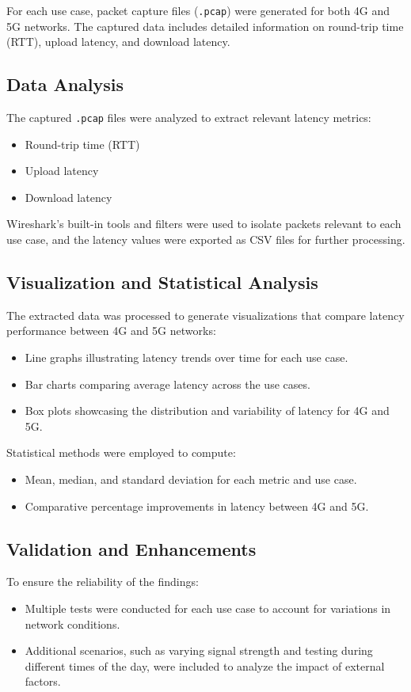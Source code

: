 \documentclass[conference]{IEEEtran}
\begin{document}
For each use case, packet capture files (\texttt{.pcap}) were generated for both 4G and 5G networks. The captured data includes detailed information on round-trip time (RTT), upload latency, and download latency. 

\subsection*{Data Analysis}
The captured \texttt{.pcap} files were analyzed to extract relevant latency metrics:
\begin{itemize}
    \item Round-trip time (RTT)
    \item Upload latency
    \item Download latency
\end{itemize}
Wireshark's built-in tools and filters were used to isolate packets relevant to each use case, and the latency values were exported as CSV files for further processing.

\subsection*{Visualization and Statistical Analysis}
The extracted data was processed to generate visualizations that compare latency performance between 4G and 5G networks:
\begin{itemize}
    \item Line graphs illustrating latency trends over time for each use case.
    \item Bar charts comparing average latency across the use cases.
    \item Box plots showcasing the distribution and variability of latency for 4G and 5G.
\end{itemize}

Statistical methods were employed to compute:
\begin{itemize}
    \item Mean, median, and standard deviation for each metric and use case.
    \item Comparative percentage improvements in latency between 4G and 5G.
\end{itemize}

\subsection*{Validation and Enhancements}
To ensure the reliability of the findings:
\begin{itemize}
    \item Multiple tests were conducted for each use case to account for variations in network conditions.
    \item Additional scenarios, such as varying signal strength and testing during different times of the day, were included to analyze the impact of external factors.
\end{itemize}
\end{document}
